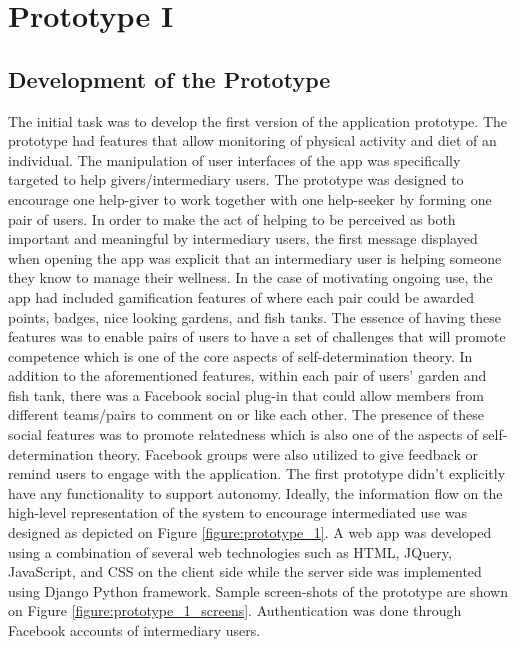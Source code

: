 
\chapter{Prototype I} %

\label{prototype1chapter} %

\section{Development of the Prototype}
The initial task was to develop the first version of the application prototype. The prototype had features that allow monitoring of physical activity and diet of an individual. The manipulation of user interfaces of the app was specifically targeted to help givers/intermediary users. The prototype was designed to encourage one help-giver to work together with one help-seeker by forming one pair of users. In order to make the act of helping to be perceived as both important and meaningful by intermediary users, the first message displayed when opening the app was explicit that an intermediary user is helping someone they know to manage their wellness. In the case of motivating ongoing use, the app had included gamification features of where each pair could be awarded points, badges, nice looking gardens, and fish tanks. The essence of having these features was to enable pairs of users to have a set of challenges that will promote competence which is one of the core aspects of self-determination theory. In addition to the aforementioned features, within each pair of users' garden and fish tank, there was a Facebook social plug-in that could allow members from different teams/pairs to comment on or like each other. The presence of these social features was to promote relatedness which is also one of the aspects of self-determination theory. Facebook groups were also utilized to give feedback or remind users to engage with the application. The first prototype didn't explicitly have any functionality to support autonomy. Ideally, the information flow on the high-level representation of the system to encourage intermediated use was designed as depicted on Figure \ref{figure:prototype_1}. A web app was developed using a combination of several web technologies such as HTML, JQuery, JavaScript, and CSS on the client side while the server side was implemented using Django Python framework. Sample screen-shots of the prototype are shown on Figure \ref{figure:prototype_1_screens}. Authentication was done through Facebook accounts of intermediary users. 

